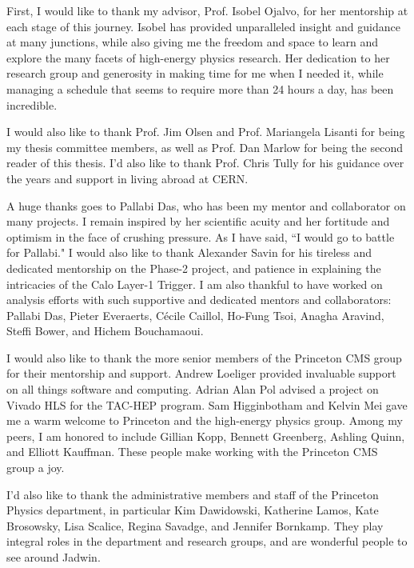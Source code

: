 

First, I would like to thank my advisor, Prof. Isobel Ojalvo, for her mentorship at each stage of this journey. Isobel has provided unparalleled insight and guidance at many junctions, while also giving me the freedom and space to learn and explore the many facets of high-energy physics research. Her dedication to her research group and generosity in making time for me when I needed it, while managing a schedule that seems to require more than 24 hours a day, has been incredible.

I would also like to thank Prof. Jim Olsen and Prof. Mariangela Lisanti for being my thesis committee members, as well as Prof. Dan Marlow for being the second reader of this thesis. I'd also like to thank Prof. Chris Tully for his guidance over the years and support in living abroad at CERN.

A huge thanks goes to Pallabi Das, who has been my mentor and collaborator on many projects. I remain inspired by her scientific acuity and her fortitude and optimism in the face of crushing pressure. As I have said, ``I would go to battle for Pallabi." I would also like to thank Alexander Savin for his tireless and dedicated mentorship on the Phase-2 project, and patience in explaining the intricacies of the Calo Layer-1 Trigger. I am also thankful to have worked on analysis efforts with such supportive and dedicated mentors and collaborators: Pallabi Das, Pieter Everaerts, C\'{e}cile Caillol, Ho-Fung Tsoi, Anagha Aravind, Steffi Bower, and Hichem Bouchamaoui.

I would also like to thank the more senior members of the Princeton CMS group for their mentorship and support. Andrew Loeliger provided invaluable support on all things software and computing. Adrian Alan Pol advised a project on Vivado HLS for the TAC-HEP program. Sam Higginbotham and Kelvin Mei gave me a warm welcome to Princeton and the high-energy physics group. Among my peers, I am honored to include Gillian Kopp, Bennett Greenberg, Ashling Quinn, and Elliott Kauffman. These people make working with the Princeton CMS group a joy.

I'd also like to thank the administrative members and staff of the Princeton Physics department, in particular Kim Dawidowski, Katherine Lamos, Kate Brosowsky,  Lisa Scalice, Regina Savadge, and Jennifer Bornkamp. They play integral roles in the department and research groups, and are wonderful people to see around Jadwin.

